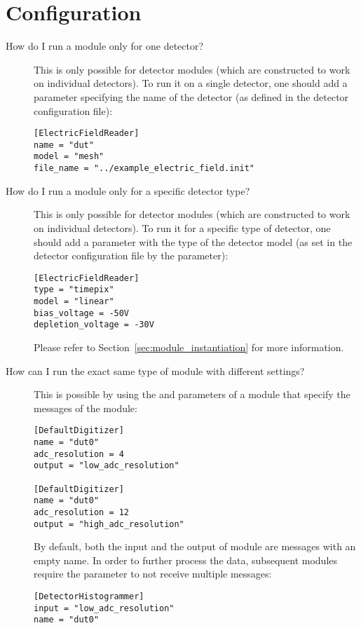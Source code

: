 \section{Configuration}
\begin{description}
\item[How do I run a module only for one detector?]
This is only possible for detector modules (which are constructed to work on individual detectors).
To run it on a single detector, one should add a parameter  specifying the name of the detector (as defined in the detector configuration file):
\begin{verbatim}
[ElectricFieldReader]
name = "dut"
model = "mesh"
file_name = "../example_electric_field.init"
\end{verbatim}
\item[How do I run a module only for a specific detector type?]
This is only possible for detector modules (which are constructed to work on individual detectors).
To run it for a specific type of detector, one should add a parameter  with the type of the detector model (as set in the detector configuration file by the  parameter):
\begin{verbatim}
[ElectricFieldReader]
type = "timepix"
model = "linear"
bias_voltage = -50V
depletion_voltage = -30V
\end{verbatim}
Please refer to Section~\ref{sec:module_instantiation} for more information.
\item[How can I run the exact same type of module with different settings?] This is possible by using the  and  parameters of a module that specify the messages of the module:
\begin{verbatim}
[DefaultDigitizer]
name = "dut0"
adc_resolution = 4
output = "low_adc_resolution"

[DefaultDigitizer]
name = "dut0"
adc_resolution = 12
output = "high_adc_resolution"
\end{verbatim}
By default, both the input and the output of module are messages with an empty name.
In order to further process the data, subsequent modules require the  parameter to not receive multiple messages:
\begin{verbatim}
[DetectorHistogrammer]
input = "low_adc_resolution"
name = "dut0"


\end{verbatim}
\end{description}
